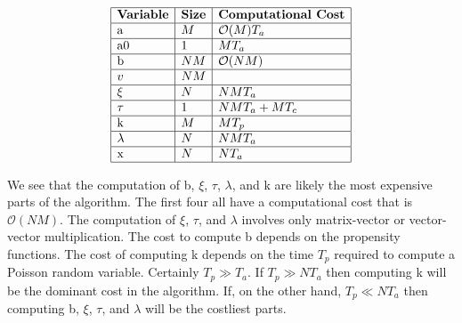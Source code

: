 \documentclass[letterpaper]{article}
\begin{document}
\begin{table}[h]
\[
\begin{array}{|l|l|l|}
\hline %
\text{\bf{Variable}} & \text{\bf{Size}} & \text{\bf{Computational Cost}} \\
\hline %
\text{a} &
M &
\mathcal{O}(M) T_a\\
\hline %
\text{a0} & 
1 &
M T_a \\
\hline %
\text{b} &
N M &
\mathcal{O}(N M) \\
\hline %
v &
N M &
 \\
\hline %
\xi &
N &
N M T_a \\
\hline %
\tau & 
1 &
N M T_a + M T_c \\
\hline %
\text{k} & 
M &
M T_p \\
\hline %
\lambda & 
N &
N M T_a \\
\hline %
\text{x} & 
N &
N T_a \\
\hline %
\end{array}
\]
\caption{Computational complexity for one step in the sequential algorithm for
	the basic $\tau$-leap method.}
\label{sequentialComplexity}
\end{table}


We see that the computation of b, $\xi$, $\tau$, $\lambda$, and k are
likely the most expensive parts of the algorithm.  The first four all
have a computational cost that is $\mathcal{O}(N M)$.  The computation
of $\xi$, $\tau$, and $\lambda$ involves only matrix-vector or
vector-vector multiplication.  The cost to compute b depends on the
propensity functions.  The cost of computing k depends on the time
$T_p$ required to compute a Poisson random variable.  Certainly 
$T_p \gg T_a$.  If $T_p \gg N T_a$ then computing k will be the dominant
cost in the algorithm.  If, on the other hand, $T_p \ll N T_a$ then
computing b, $\xi$, $\tau$, and $\lambda$ will be the costliest parts.
\end{document}
